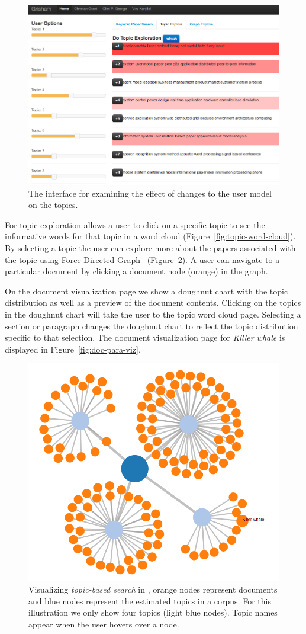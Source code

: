 \begin{figure}[htb]\centering
\includegraphics[width=.45\textwidth]{images/topic_exploration.png} %
\caption{The interface for examining the effect of changes to the user model on the topics.}
\label{fig:topic_exploration}
\end{figure}

For topic exploration \system allows a user to click on a specific 
topic to see the informative words for that topic in a word cloud 
(Figure~\ref{fig:topic-word-cloud}). By selecting a topic the user 
can explore more about the papers associated with the topic using 
Force-Directed Graph~\cite{2011-d3} (Figure~\ref{fig:topic-search-viz}).
A user can navigate to a particular document by clicking a document 
node (orange) in the graph. 

On the document visualization page we show a doughnut chart with the topic distribution as well as a preview of the document contents.
Clicking on the topics in the doughnut chart will take the user to the topic word cloud page.
Selecting a section or paragraph changes the doughnut chart to reflect the topic distribution specific to that selection.
The document visualization page for \textit{Killer whale} is displayed in Figure~\ref{fig:doc-para-viz}.





\begin{figure}[htb]\centering 
\includegraphics[width=.5\textwidth]{images/topical_docs.png}
\caption{Visualizing \textsl{topic-based search} in \system, orange 
nodes represent documents and blue nodes represent the estimated 
topics in a corpus. For this illustration we only show four topics 
(light blue nodes). Topic names appear when the user hovers over a 
node.}
\label{fig:topic-search-viz}
\end{figure}

